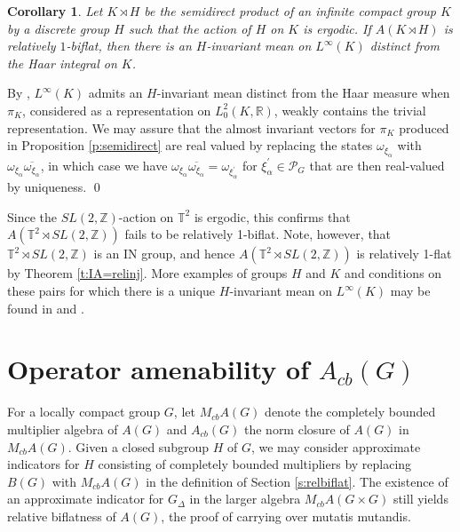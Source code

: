 \documentclass[preprint,12pt]{elsarticle}
\newtheorem{cor}[thm]{Corollary}
\begin{document}
\begin{cor}
Let $K\rtimes H$ be the semidirect product of an infinite compact group $K$
by a discrete group $H$ such that the action of $H$ on $K$ is ergodic.
If $A(K\rtimes H)$ is relatively $1$-biflat, then there
is an $H$-invariant mean on $L^{\infty}(K)$ distinct
from the Haar integral on $K$.\end{cor}
\begin{pf}
By \cite[Theorem 1.6]{FS}, $L^{\infty}(K)$ admits an
$H$-invariant mean distinct from the Haar measure when $\pi_{K}$,
considered as a representation on $L_{0}^{2}(K,\mathbb{R})$,
weakly contains the trivial representation. We may assure that the
almost invariant vectors for $\pi_{K}$ produced in Proposition \ref{p:semidirect}
 are real valued by replacing the states $\omega_{\xi_{\alpha}}$ with
$\omega_{\xi_{\alpha}}\overline{\omega_{\xi_{\alpha}}}$, in which
case we have $\omega_{\xi_{\alpha}}\overline{\omega_{\xi_{\alpha}}}=\omega_{\xi_{\alpha}^{\prime}}$
for $\xi_{\alpha}^{\prime}\in\mathcal{P}_{G}$ that are then real-valued
by uniqueness.
\qed\end{pf}

Since the $SL(2,\mathbb{Z})$-action on $\mathbb{T}^{2}$
is ergodic, this confirms that $A(\mathbb{T}^{2}\rtimes SL(2,\mathbb{Z}))$
fails to be relatively 1-biflat. Note, however, that $\mathbb{T}^{2}\rtimes SL(2,\mathbb{Z})$ is an IN group, and hence $A(\mathbb{T}^{2}\rtimes SL(2,\mathbb{Z}))$ is relatively 1-flat by Theorem \ref{t:IA=relinj}. More examples of groups $H$ and $K$ and conditions on these pairs for which there
is a unique $H$-invariant mean on $L^{\infty}(K)$ may be found in \cite{Bekka2} and \cite{FS}.

\section{Operator amenability of $A_{cb}(G)$}

For a locally compact group $G$, let $M_{cb}A(G)$ denote
the completely bounded multiplier algebra of $A(G)$ and
$A_{cb}(G)$ the norm closure of $A(G)$ in
$M_{cb}A(G)$. Given a closed subgroup $H$ of $G$, we
may consider approximate indicators for $H$ consisting of completely
bounded multipliers by replacing $B(G)$ with $M_{cb}A(G)$
in the definition of Section \ref{s:relbiflat}. The existence of an approximate indicator
for $G_{\Delta}$ in the larger algebra $M_{cb}A(G\times G)$
still yields relative biflatness of $A(G)$, the proof
of \cite[Proposition 2.3]{ARS} carrying over mutatis mutandis.
\end{document}
